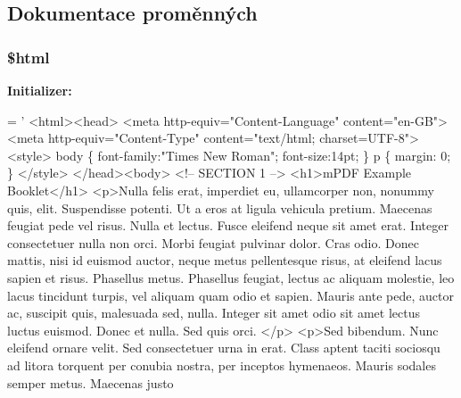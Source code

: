 \subsection{Dokumentace proměnných}
\hypertarget{example43___m_p_d_f_i__booklet_8php_a6f96e7fc92441776c9d1cd3386663b40}{
\subsubsection[{\$html}]{\setlength{\rightskip}{0pt plus 5cm}\$html}}\label{example43___m_p_d_f_i__booklet_8php_a6f96e7fc92441776c9d1cd3386663b40}
{\bfseries Initializer\-:}
\begin{DoxyCode}
= \textcolor{stringliteral}{'}
\textcolor{stringliteral}{<html><head>}
\textcolor{stringliteral}{    <meta http-equiv="Content-Language" content="en-GB">}
\textcolor{stringliteral}{    <meta http-equiv="Content-Type" content="text/html; charset=UTF-8">}
\textcolor{stringliteral}{    <style>}
\textcolor{stringliteral}{        body \{ font-family:"Times New Roman"; font-size:14pt; \}}
\textcolor{stringliteral}{        p \{ margin: 0; \}}
\textcolor{stringliteral}{    </style>}
\textcolor{stringliteral}{</head><body>}
\textcolor{stringliteral}{}
\textcolor{stringliteral}{<!-- SECTION 1 -->}
\textcolor{stringliteral}{<h1>mPDF Example Booklet</h1>}
\textcolor{stringliteral}{<p>Nulla felis erat, imperdiet eu, ullamcorper non, nonummy quis, elit. Suspendisse potenti. Ut a eros at
       ligula vehicula pretium. Maecenas feugiat pede vel risus. Nulla et lectus. Fusce eleifend neque sit amet
       erat. Integer consectetuer nulla non orci. Morbi feugiat pulvinar dolor. Cras odio. Donec mattis, nisi id
       euismod auctor, neque metus pellentesque risus, at eleifend lacus sapien et risus. Phasellus metus. Phasellus
       feugiat, lectus ac aliquam molestie, leo lacus tincidunt turpis, vel aliquam quam odio et sapien. Mauris ante
       pede, auctor ac, suscipit quis, malesuada sed, nulla. Integer sit amet odio sit amet lectus luctus euismod.
       Donec et nulla. Sed quis orci. </p>}
\textcolor{stringliteral}{}
\textcolor{stringliteral}{}
\textcolor{stringliteral}{<p>Sed bibendum. Nunc eleifend ornare velit. Sed consectetuer urna in erat. Class aptent taciti sociosqu ad
       litora torquent per conubia nostra, per inceptos hymenaeos. Mauris sodales semper metus. Maecenas justo
}
\end{DoxyCode}
